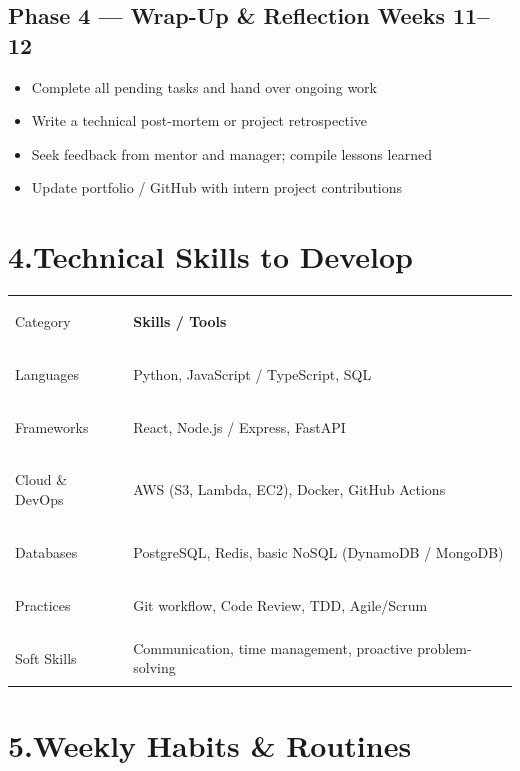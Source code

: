 \documentclass[12pt,a4paper]{article}
\begin{document}
\subsection{Phase 4 — Wrap-Up \& Reflection \hfill \textcolor{accent}{Weeks 11--12}}
\begin{itemize}[leftmargin=1.4em, itemsep=2pt]
  \item Complete all pending tasks and hand over ongoing work
  \item Write a technical post-mortem or project retrospective
  \item Seek feedback from mentor and manager; compile lessons learned
  \item Update portfolio / GitHub with intern project contributions
\end{itemize}

\section{4.\quad Technical Skills to Develop}

\vspace{4pt}
\noindent
\begin{tabularx}{\linewidth}{>{\bfseries\raggedright\arraybackslash}p{3.2cm}
                              >{\raggedright\arraybackslash}X}
\rowcolor{midblue}
\color{white}Category & \color{white}\textbf{Skills / Tools} \\
\rowcolor{lightblue}
Languages    & Python, JavaScript / TypeScript, SQL \\
Frameworks   & React, Node.js / Express, FastAPI \\
\rowcolor{lightblue}
Cloud \& DevOps & AWS (S3, Lambda, EC2), Docker, GitHub Actions \\
Databases    & PostgreSQL, Redis, basic NoSQL (DynamoDB / MongoDB) \\
\rowcolor{lightblue}
Practices    & Git workflow, Code Review, TDD, Agile/Scrum \\
Soft Skills  & Communication, time management, proactive problem-solving \\
\end{tabularx}

\section{5.\quad Weekly Habits \& Routines}
\end{document}
